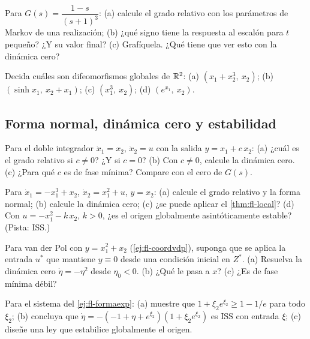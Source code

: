 \begin{problema}\label{prob:fl-markov}
Para $G(s)=\dfrac{1-s}{(s+1)^3}$: (a) calcule el grado relativo con los parámetros de Markov de una realización; (b) ¿qué signo tiene la respuesta al escalón para $t$ pequeño? ¿Y su valor final? (c) \etiquetaM{} Grafíquela. ¿Qué tiene que ver esto con la dinámica cero?
\end{problema}

\begin{problema}\label{prob:fl-difeo}
Decida cuáles son difeomorfismos globales de $\mathbb{R}^2$: (a) $(x_1+x_2^3,\ x_2)$; (b) $(\sinh x_1,\ x_2+x_1)$; (c) $(x_1^3,\ x_2)$; (d) $(e^{x_1},\ x_2)$.
\end{problema}

\subsection*{Forma normal, dinámica cero y estabilidad}

\begin{problema}\label{prob:fl-sensor}
Para el doble integrador $\dot x_1=x_2$, $\dot x_2=u$ con la salida $y=x_1+c\,x_2$: (a) ¿cuál es el grado relativo si $c\neq0$? ¿Y si $c=0$? (b) Con $c\neq0$, calcule la dinámica cero. (c) ¿Para qué $c$ es de fase mínima? Compare con el cero de $G(s)$.
\end{problema}

\begin{problema}\label{prob:fl-iss}
Para $\dot x_1=-x_1^3+x_2$, $\dot x_2=x_1^2+u$, $y=x_2$: (a) calcule el grado relativo y la forma normal; (b) calcule la dinámica cero; (c) ¿se puede aplicar el \cref{thm:fl-local}? (d) Con $u=-x_1^2-k\,x_2$, $k>0$, ¿es el origen globalmente asintóticamente estable? (Pista: ISS.)
\end{problema}

\begin{problema}\label{prob:fl-vdpcero}
Para van der Pol con $y=x_1^2+x_2$ (\cref{ej:fl-coordvdp}), suponga que se aplica la entrada $u^*$ que mantiene $y\equiv0$ desde una condición inicial en $Z^*$. (a) Resuelva la dinámica cero $\dot\eta=-\eta^2$ desde $\eta_0<0$. (b) ¿Qué le pasa a $x$? (c) ¿Es de fase mínima débil?
\end{problema}

\begin{problema}\label{prob:fl-expiss}
\etiquetaEstrella{} Para el sistema del \cref{ej:fl-formaexp}: (a) muestre que $1+\xi_2e^{\xi_2}\ge1-1/e$ para todo $\xi_2$; (b) concluya que $\dot\eta=-(-1+\eta+e^{\xi_2})(1+\xi_2e^{\xi_2})$ es ISS con entrada $\xi$; (c) diseñe una ley que estabilice globalmente el origen.
\end{problema}

